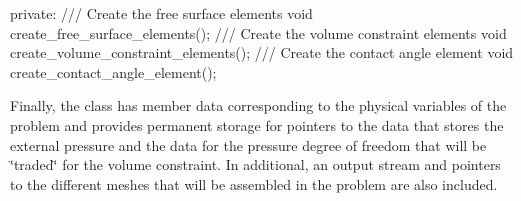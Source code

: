 \begin{DoxyCodeInclude}

\textcolor{keyword}{private}:
 \textcolor{comment}{}
\textcolor{comment}{ /// Create the free surface elements}
\textcolor{comment}{} \textcolor{keywordtype}{void} create\_free\_surface\_elements();
\textcolor{comment}{}
\textcolor{comment}{ /// Create the volume constraint elements}
\textcolor{comment}{} \textcolor{keywordtype}{void} create\_volume\_constraint\_elements();
\textcolor{comment}{}
\textcolor{comment}{ /// Create the contact angle element}
\textcolor{comment}{} \textcolor{keywordtype}{void} create\_contact\_angle\_element();

\end{DoxyCodeInclude}


Finally, the class has member data corresponding to the physical variables of the problem and provides permanent storage for pointers to the data that stores the external pressure and the data for the pressure degree of freedom that will be \char`\"{}traded\char`\"{} for the volume constraint. In additional, an output stream and pointers to the different meshes that will be assembled in the problem are also included.


